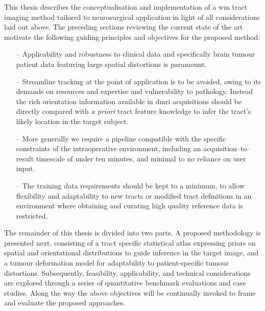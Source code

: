 This thesis describes the conceptualisation and implementation of a \gls{wm} tract imaging method tailored to neurosurgical application in light of all considerations laid out above.
The preceding sections reviewing the current state of the art motivate the following guiding principles and objectives for the proposed method:
\begin{itemize}[itemsep=0pt,parsep=0pt]
\item[--] Applicability and robustness to clinical data and specifically brain tumour patient data featuring large spatial distortions is paramount.
\item[--] Streamline tracking at the point of application is to be avoided, owing to its demands on resources and expertise and vulnerability to pathology.
Instead the rich orientation information available in \gls{dmri} acquisitions should be directly compared with \textit{a priori} tract feature knowledge to infer the tract's likely location in the target subject.
\item[--] More generally we require a pipeline compatible with the specific constraints of the intraoperative environment, including an acquisition--to--result timescale of under ten minutes, and minimal to no reliance on user input.
\item[--] The training data requirements should be kept to a minimum, to allow flexibility and adaptability to new tracts or modified tract definitions in an environment where obtaining and curating high quality reference data is restricted.
\end{itemize}

The remainder of this thesis is divided into two parts.
A proposed methodology is presented next, consisting of a tract specific statistical atlas expressing priors on spatial and orientational distributions to guide inference in the target image, and a tumour deformation model for adaptability to patient-specific tumour distortions.
Subsequently, feasibility, applicability, and technical considerations are explored through a series of quantitative benchmark evaluations and case studies.
Along the way the above objectives will be continually invoked to frame and evaluate the proposed approaches.
